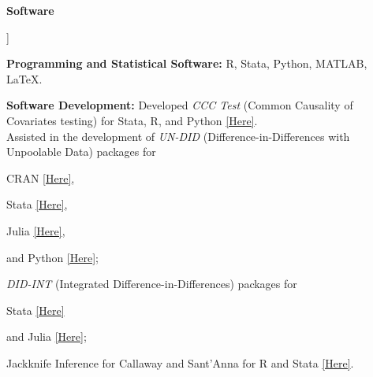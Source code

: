 \documentclass[11pt]{article}
\newcommand{\cvlabel}[1]{%
    \raisebox{0pt}[0pt][0pt]{%
        \parbox[t]{1.38in}{%
            \raggedright
            \bfseries
            #1
        }%
    }%
}
\begin{document}
\begin{cvsections}
\item[\cvlabel{Software}]

\textbf{Programming and Statistical Software:}
R,
Stata,
Python,
MATLAB,
LaTeX.

\begin{cvitems}

\item
\textbf{Software Development:}
Developed \textit{CCC Test}
(Common Causality of Covariates testing)
for Stata, R, and Python
\href{https://github.com/SunnyRKarim/ccctest}
{[Here]}. \\
Assisted in the development of
\textit{UN-DID}
(Difference-in-Differences with Unpoolable Data)
packages for

CRAN
\href{https://cran.r-project.org/web/packages/undidR/vignettes/undidR.html}
{[Here]},

Stata
\href{https://ideas.repec.org/c/boc/bocode/s459516.html}
{[Here]},

Julia
\href{https://github.com/ebjamieson97/undidjl}
{[Here]},

and Python
\href{https://github.com/ebjamieson97/undidPyjl}
{[Here]};

\textit{DID-INT}
(Integrated Difference-in-Differences)
packages for

Stata
\href{https://github.com/ebjamieson97/didintjl}
{[Here]}

and Julia
\href{https://github.com/ebjamieson97/DiDInt.jl}
{[Here]};

Jackknife Inference for Callaway and Sant'Anna
for R and Stata
\href{https://github.com/mattdwebb/fastcsdid}
{[Here]}.



\end{cvitems}





\end{cvsections}
\end{document}
